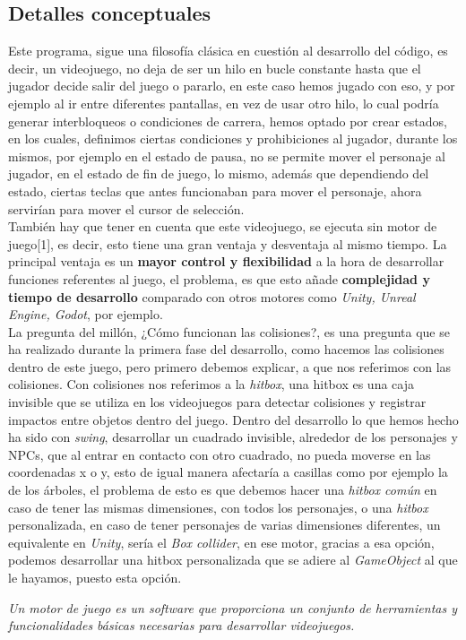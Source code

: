 \documentclass[a4paper]{article}
\begin{document}
\subsection{Detalles conceptuales}
Este programa, sigue una filosofía clásica en cuestión al desarrollo del código, es decir, un videojuego, no deja de ser un hilo en bucle constante hasta que el jugador decide salir del juego o pararlo, en este caso hemos jugado con eso, y por ejemplo al ir entre
diferentes pantallas, en vez de usar otro hilo, lo cual podría generar interbloqueos o condiciones de carrera, hemos optado por crear estados, en los cuales, definimos ciertas condiciones y prohibiciones al jugador, durante los mismos, por ejemplo en el estado de pausa,
no se permite mover el personaje al jugador, en el estado de fin de juego, lo mismo, además que dependiendo del estado, ciertas teclas que antes funcionaban para mover el personaje, ahora servirían para mover el cursor de selección.\\
También hay que tener en cuenta que este videojuego, se ejecuta sin motor de juego[1], es decir, esto tiene una gran ventaja y desventaja al mismo tiempo. La principal ventaja es un \textbf{mayor control y flexibilidad} a la hora de desarrollar funciones referentes al juego, el problema, es
que esto añade \textbf{complejidad y tiempo de desarrollo} comparado con otros motores como \textit{Unity, Unreal Engine, Godot}, por ejemplo.\\
La pregunta del millón, ¿Cómo funcionan las colisiones?, es una pregunta que se ha realizado durante la primera fase del desarrollo, como hacemos las colisiones dentro de este juego, pero primero debemos explicar, a que nos referimos con las colisiones.
Con colisiones nos referimos a la \textit{hitbox}, una hitbox es una caja invisible que se utiliza en los videojuegos para detectar colisiones y registrar impactos entre objetos dentro del juego. Dentro del desarrollo lo que hemos hecho ha sido con \textit{swing}, desarrollar un cuadrado invisible,
alrededor de los personajes y NPCs, que al entrar en contacto con otro cuadrado, no pueda moverse en las coordenadas x o y, esto de igual manera afectaría a casillas como por ejemplo la de los árboles, el problema de esto es que debemos hacer una \textit{hitbox común} en caso de tener las mismas dimensiones,
con todos los personajes, o una \textit{hitbox} personalizada, en caso de tener personajes de varias dimensiones diferentes, un equivalente en \textit{Unity}, sería el \textit{Box collider}, en ese motor, gracias a esa opción, podemos desarrollar una hitbox personalizada que se adiere al \textit{GameObject} al que le hayamos,
puesto esta opción.\\
\begin{flushright}
    [1]\textit{Un motor de juego es un software que proporciona un conjunto de herramientas y funcionalidades básicas necesarias para desarrollar videojuegos.}
\end{flushright}
\end{document}
